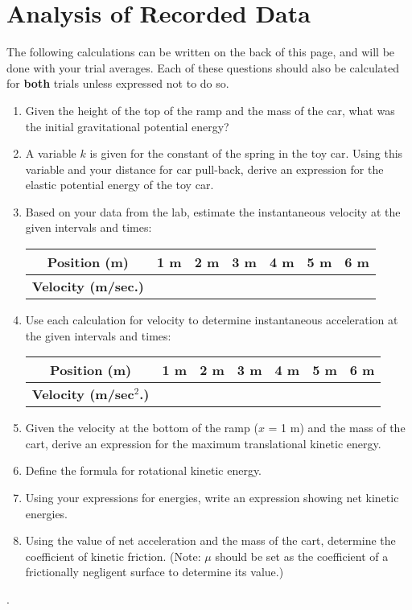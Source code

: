 \documentclass[12pt, letterpaper]{report}
\begin{document}
    \section{Analysis of Recorded Data}
      The following calculations can be written on the back of this page, and will be done with your trial averages. Each of these questions should also be calculated for \textbf{both} trials unless expressed not to do so.
      \begin{enumerate}
        \item{Given the height of the top of the ramp and the mass of the car, what was the initial gravitational potential energy?}
        \item{A variable $k$ is given for the constant of the spring in the toy car. Using this variable and your distance for car pull-back, derive an expression for the elastic potential energy of the toy car.}
        \item{Based on your data from the lab, estimate the instantaneous velocity at the given intervals and times:}
        \begin{center}
          \begin{tabular}{| c | c | c | c | c | c | c |}
            \hline
            \textbf{Position (m)} & 1 m & 2 m & 3 m & 4 m & 5 m & 6 m \\
            \hline
            \textbf{Velocity (m/sec.)} & & & & & & \\
            \hline
          \end{tabular}
        \end{center}
        \item{Use each calculation for velocity to determine instantaneous acceleration at the given intervals and times:}
        \begin{center}
          \begin{tabular}{| c | c | c | c | c | c | c |}
            \hline
            \textbf{Position (m)} & 1 m & 2 m & 3 m & 4 m & 5 m & 6 m \\
            \hline
            \textbf{Velocity (m/sec$^{2}$.)} & & & & & & \\
            \hline
          \end{tabular}
        \end{center}
        \item{Given the velocity at the bottom of the ramp ($x$ = 1 m) and the mass of the cart, derive an expression for the maximum translational kinetic energy.}
        \item{Define the formula for rotational kinetic energy.}
        \item{Using your expressions for energies, write an expression showing net kinetic energies.}
        \item{Using the value of net acceleration and the mass of the cart, determine the coefficient of kinetic friction. (Note: $\mu$ should be set as the coefficient of a frictionally negligent surface to determine its value.)}
      \end{enumerate}
    \pagebreak
    .
    \pagebreak
\end{document}
